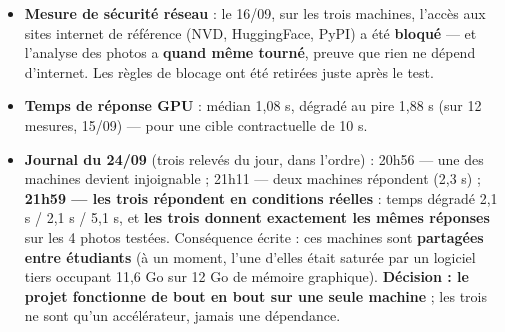 \documentclass[11pt,a4paper]{article}
\begin{document}
\begin{itemize}  \item \textbf{Mesure de sécurité réseau} : le 16/09, sur les trois machines, l'accès aux sites internet de référence (NVD, HuggingFace, PyPI) a été \textbf{bloqué} — et l'analyse des photos a \textbf{quand même tourné}, preuve que rien ne dépend d'internet. Les règles de blocage ont été retirées juste après le test.
\end{itemize}

\begin{itemize}  \item \textbf{Temps de réponse GPU} : médian 1,08 s, dégradé au pire 1,88 s (sur 12 mesures, 15/09) — pour une cible contractuelle de 10 s.
\end{itemize}

\begin{itemize}  \item \textbf{Journal du 24/09} (trois relevés du jour, dans l'ordre) : 20h56 — une des machines devient injoignable ; 21h11 — deux machines répondent (2,3 s) ; \textbf{21h59 — les trois répondent en conditions réelles} : temps dégradé 2,1 s / 2,1 s / 5,1 s, et \textbf{les trois donnent exactement les mêmes réponses} sur les 4 photos testées. Conséquence écrite : ces machines sont \textbf{partagées entre étudiants} (à un moment, l'une d'elles était saturée par un logiciel tiers occupant 11,6 Go sur 12 Go de mémoire graphique). \textbf{Décision : le projet fonctionne de bout en bout sur une seule machine} ; les trois ne sont qu'un accélérateur, jamais une dépendance.
\end{itemize}
\end{document}
